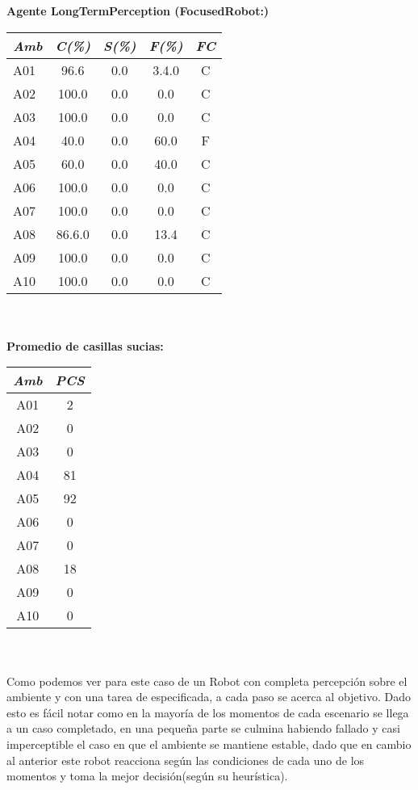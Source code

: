 \documentclass[a4paper,10pt,twocolumn]{article}
\begin{document}
\textbf{Agente LongTermPerception (FocusedRobot:)}

	
	\begin{tabular}{|l|c|c|c|c|}
		\textit{Amb}  &\textit{C(\%)}& \textit{S(\%)}& \textit{F(\%)}& \textit{FC}  \\ 
		\hline
		A01  &96.6 &0.0 &3.4.0 & C\\
		A02  &100.0 &0.0 &0.0 & C\\
		A03  &100.0 &0.0 &0.0 & C\\
		A04  &40.0 &0.0 &60.0 & F\\
		A05  &60.0 &0.0 &40.0 & C\\
		
		A06  &100.0 &0.0 &0.0 & C\\
		A07  &100.0 &0.0 &0.0 & C\\
		A08  &86.6.0 &0.0 &13.4 & C\\
		A09  &100.0 &0.0 &0.0 & C\\
		A10  &100.0 &0.0 &0.0 & C\\
		
	\end{tabular}
	\\\\
	
	\textbf{Promedio de casillas sucias:}
	
	\begin{tabular}{|c|c|}
		\textit{Amb}  &\textit{PCS}  \\ 
		\hline
		A01  &2 \\
		A02  &0 \\
		A03  &0 \\
		A04  &81 \\
		A05  &92 \\
		A06  &0 \\
		A07  &0 \\
		A08  &18 \\
		A09  &0 \\
		A10  &0 \\
		
	\end{tabular}
\\\\
Como podemos ver para este caso de un Robot con completa percepci\'on sobre el ambiente y con una tarea de especificada, a cada paso se acerca al objetivo. Dado esto es f\'acil notar como en la mayor\'ia de los momentos de cada escenario se llega a un caso completado, en una peque\~na parte se culmina habiendo fallado y casi imperceptible el caso en que el ambiente se mantiene estable, dado que en cambio al anterior este robot reacciona seg\'un las condiciones de cada uno de los momentos y toma la mejor decisi\'on(seg\'un su heur\'istica).
	
\end{document}
